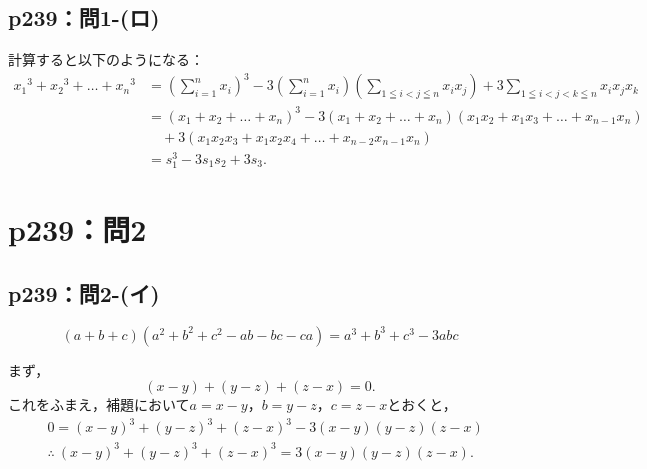 \documentclass[a4paper,10pt,fleqn]{ltjsarticle}
\begin{document}
\subsection*{p239：問1-(ロ)}
\begin{tleftbar}
    計算すると以下のようになる：
    \begin{align*}
        {x_1}^3 + {x_2}^3+\dots+{x_n}^3 & = \left (\sum_{i=1}^{n} x_i \right )^3 - 3\left (\sum_{i=1}^{n} x_i \right ) \left(\sum_{1 \leqq i <j \leqq n} x_i x_j \right) + 3\sum_{1\leqq i < j < k \leqq n} x_i x_j x_k \\
                                        & = (x_1+x_2+\dots+x_n)^3 -3 (x_1+x_2+\dots+x_n)(x_1 x_2 +x_1 x_3 + \dots + x_{n-1} x_n)                                                                                        \\
                                        & \quad  +3(x_1 x_2 x_3 + x_1 x_2 x_4 + \dots + x_{n-2} x_{n-1} x_n)                                                                                                            \\
                                        & = s_1^3 -3s_1 s_2 + 3s_3.
    \end{align*}
\end{tleftbar}

\section*{p239：問2}

\subsection*{p239：問2-(イ)}



\[
    (a+b+c)(a^2+b^2 +c^2 -ab - bc -ca) = a^3 + b^3 + c^3 -3abc
\]

\begin{tleftbar}
    まず，
    \[
        (x-y)+(y-z)+(z-x) =0.
    \]
    これをふまえ，補題において$a=x-y$，$b=y-z$，$c=z-x$とおくと，
    \begin{align*}
         & 0 = (x-y)^3 + (y-z)^3 + (z-x)^3 - 3(x-y)(y-z)(z-x)           \\
         & \therefore ~ (x-y)^3 + (y-z)^3 + (z-x)^3 = 3(x-y)(y-z)(z-x).
    \end{align*}
\end{tleftbar}
\end{document}
